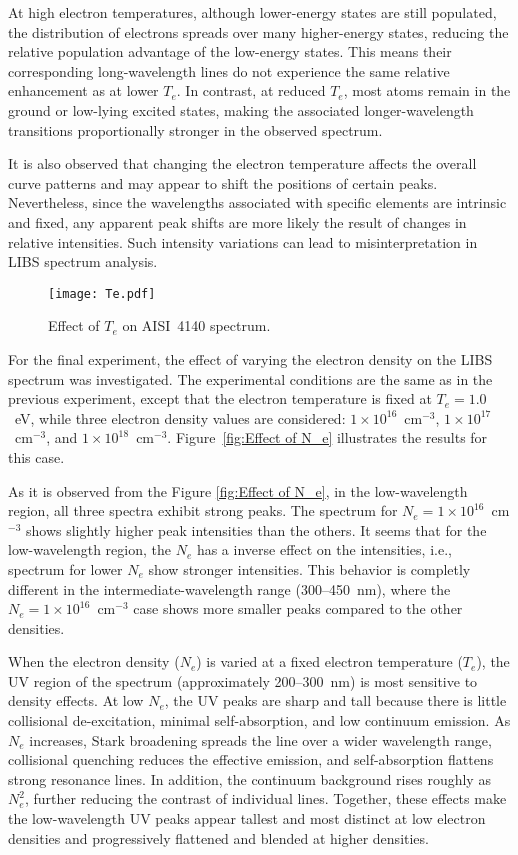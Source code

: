 \documentclass[12pt,a4paper]{article}
\begin{document}
	At high electron temperatures, although lower-energy states are still populated, the distribution of electrons spreads over many higher-energy states, reducing the relative population advantage of the low-energy states. This means their corresponding long-wavelength lines do not experience the same relative enhancement as at lower $T_e$. In contrast, at reduced $T_e$, most atoms remain in the ground or low-lying excited states, making the associated longer-wavelength transitions proportionally stronger in the observed spectrum.  
	
	It is also observed that changing the electron temperature affects the overall curve patterns and may appear to shift the positions of certain peaks. Nevertheless, since the wavelengths associated with specific elements are intrinsic and fixed, any apparent peak shifts are more likely the result of changes in relative intensities. Such intensity variations can lead to misinterpretation in LIBS spectrum analysis.
	
		
		
	\begin{figure}[h!]
		\centering
		\texttt{[image: Te.pdf]}
		\caption{Effect of $T_e$ on AISI~4140 spectrum.}
		\label{fig:Effect of T_e}
	\end{figure}
	
	For the final experiment, the effect of varying the electron density on the LIBS spectrum was investigated. The experimental conditions are the same as in the previous experiment, except that the electron temperature is fixed at $T_e = 1.0$~eV, while three electron density values are considered: $1\times10^{16}$~cm$^{-3}$, $1\times10^{17}$~cm$^{-3}$, and $1\times10^{18}$~cm$^{-3}$. Figure~\ref{fig:Effect of N_e} illustrates the results for this case.
	
	 As it is observed from the Figure \ref{fig:Effect of N_e}, in the low-wavelength region, all three spectra exhibit strong peaks. The spectrum for $N_e = 1\times 10^{16}$~cm$^{-3}$ shows slightly higher peak intensities than the others. It seems that for the low-wavelength region, the $N_e$ has a inverse effect on the intensities, i.e., spectrum for lower $N_e$ show stronger intensities. This behavior is completly different in the intermediate-wavelength range (300--450~nm), where the $N_e = 1\times 10^{16}$~cm$^{-3}$ case shows more  smaller peaks compared to the other densities.
	 
	 When the electron density ($N_e$) is varied at a fixed electron temperature ($T_e$), the UV region of the spectrum (approximately 200--300~nm) is most sensitive to density effects. At low $N_e$, the UV peaks are sharp and tall because there is little collisional de-excitation, minimal self-absorption, and low continuum emission. As $N_e$ increases, Stark broadening spreads the line over a wider wavelength range, collisional quenching reduces the effective emission, and self-absorption flattens strong resonance lines. In addition, the continuum background rises roughly as $N_e^2$, further reducing the contrast of individual lines. Together, these effects make the low-wavelength UV peaks appear tallest and most distinct at low electron densities and progressively flattened and blended at higher densities.  
	 
\end{document}
